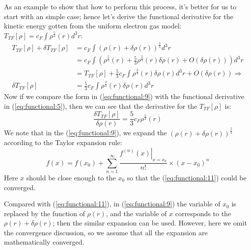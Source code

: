 As an example to show that how to perform this process, it's better
for us to start with an simple case; hence let's derive the functional
derivative for the kinetic energy gotten from the uniform electron gas
model: $T_{TF}[\rho] = c_{F}\int \rho^{\frac{5}{3}}(r) d^{3}r$:
\begin{equation}\label{eq:functional:9}
  \begin{split}
    T_{TF}[\rho] + \delta T_{TF}[\rho] &= c_{F}\int \left(\rho(r) +
      \delta\rho(r) \right)^{\frac{5}{3}} d^{3}r \\
    &= c_{F}\int \left(\rho^{\frac{5}{3}}(r) +
      \frac{5}{3}\rho^{\frac{2}{3}}(r)\delta\rho(r)
      + O(\delta\rho(r)) \right) d^{3}r  \\
    &= T_{TF}[\rho] + \frac{5}{3}c_{F}\int
    \rho^{\frac{2}{3}}(r)\delta\rho(r)d^{3}r
    + O(\delta\rho(r)) \Rightarrow \\
   \delta T_{TF}[\rho] &= \frac{5}{3}c_{F}\int\rho^{\frac{2}{3}}(r)
    \delta\rho(r)d^{3}r
  \end{split}
\end{equation}
Now if we compare the form in (\ref{eq:functional:9}) with the
functional derivative in (\ref{eq:functional:5}), then we can see that
the derivative for the $T_{TF}[\rho]$ is:
\begin{equation}
  \label{eq:functional:10}
  \frac{\delta T_{TF}[\rho]}{\delta\rho(r)} = \frac{5}{3}c_{F}
  \rho^{\frac{2}{3}}(r)   
\end{equation}
We note that in the (\ref{eq:functional:9}), we expand the
$\left(\rho(r) + \delta\rho(r) \right)^{\frac{5}{3}}$ according to the
Taylor expansion rule:
\begin{equation}
  \label{eq:functional:11}
  f(x) = f(x_{0}) +
  \sum_{n=1}^{\infty}\frac{\left.f^{(n)}(x)\right|_{x=x_{0}}}{n!}\times
  (x-x_{0})^{n}   
\end{equation}
Here $x$ should be close enough to the $x_{0}$ so that the
(\ref{eq:functional:11}) could be converged.

Compared with (\ref{eq:functional:11}), in (\ref{eq:functional:9}) the
variable of $x_{0}$ is replaced by the function of $\rho(r)$, and the
variable of $x$ corresponds to the $\rho(r) + \delta\rho(r)$; then the
similar expansion can be used. However, here we omit the convergence
discussion, so we assume that all the expansion are mathematically
converged.

